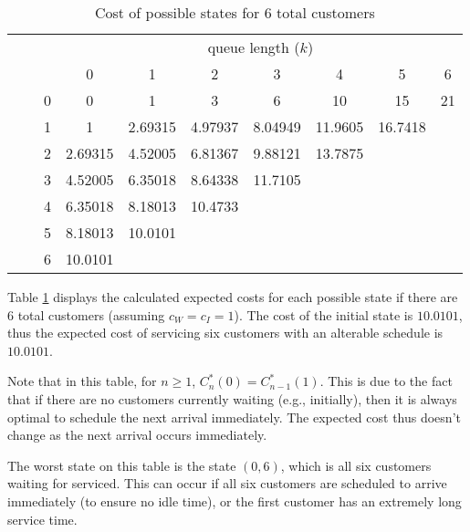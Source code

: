 \begin{table}[htb]
	\centering
	\begin{tabular}{c c c || c | c | c | c | c | c | c}
		& & & \multicolumn{7}{c}{queue length ($k$)} \\
		& & & 0 & 1 & 2 & 3 & 4 & 5 & 6 \\ \hline \hline
		\parbox[t]{2mm}{} & \parbox[t]{2mm}{} & 0 & 0 & 1 & 3 & 6 & 10 & 15 & 21 \\
		& & 1 & 1 & 2.69315 & 4.97937 & 8.04949 & 11.9605 & 16.7418 \\
		& & 2 & 2.69315 & 4.52005 & 6.81367 & 9.88121 & 13.7875 & \\
		& & 3 & 4.52005 & 6.35018 & 8.64338 & 11.7105 & & \\
		& & 4 & 6.35018 & 8.18013 & 10.4733 & & & \\
		& & 5 & 8.18013 & 10.0101 & & & & \\
		& & 6 & 10.0101 & & & & & \\
	\end{tabular}
	\caption{Cost of possible states for 6 total customers}
	\label{Cost_6_Customers}
\end{table}

Table \ref{Cost_6_Customers} displays the calculated expected costs for each possible state if there are 6 total customers (assuming $c_{W} = c_{I} = 1$). The cost of the initial state is $10.0101$, thus the expected cost of servicing six customers with an alterable schedule is $10.0101$.

Note that in this table, for $n \geq 1$, $C_{n}^{*} (0) = C_{n - 1}^{*} (1)$. This is due to the fact that if there are no customers currently waiting (e.g., initially), then it is always optimal to schedule the next arrival immediately. The expected cost thus doesn't change as the next arrival occurs immediately.

The worst state on this table is the state $(0, 6)$, which is all six customers waiting for serviced. This can occur if all six customers are scheduled to arrive immediately (to ensure no idle time), or the first customer has an extremely long service time.

